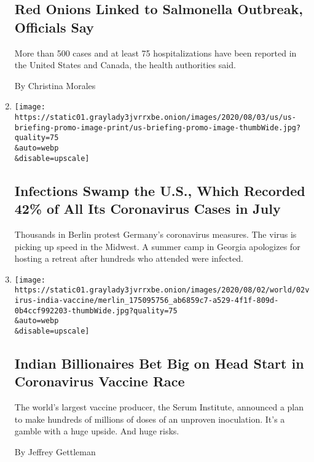 \begin{enumerate}
{  \subsection{Red Onions Linked to Salmonella Outbreak, Officials
  Say}\label{red-onions-linked-to-salmonella-outbreak-officials-say}}

  More than 500 cases and at least 75 hospitalizations have been
  reported in the United States and Canada, the health authorities said.

  By Christina Morales
\item
  \href{/2020/08/01/world/coronavirus-covid-19.html}{}

  \texttt{[image: https://static01.graylady3jvrrxbe.onion/images/2020/08/03/us/us-briefing-promo-image-print/us-briefing-promo-image-thumbWide.jpg?quality=75\\\&auto=webp\\\&disable=upscale]}

  \hypertarget{infections-swamp-the-us-which-recorded-42-of-all-its-coronavirus-cases-in-july}{%
  \subsection{Infections Swamp the U.S., Which Recorded 42\% of All Its
  Coronavirus Cases in
  July}\label{infections-swamp-the-us-which-recorded-42-of-all-its-coronavirus-cases-in-july}}

  Thousands in Berlin protest Germany's coronavirus measures. The virus
  is picking up speed in the Midwest. A summer camp in Georgia
  apologizes for hosting a retreat after hundreds who attended were
  infected.
\item
  \href{/2020/08/01/world/asia/coronavirus-vaccine-india.html}{}

  \texttt{[image: https://static01.graylady3jvrrxbe.onion/images/2020/08/02/world/02virus-india-vaccine/merlin\_175095756\_ab6859c7-a529-4f1f-809d-0b4ccf992203-thumbWide.jpg?quality=75\\\&auto=webp\\\&disable=upscale]}

  \hypertarget{indian-billionaires-bet-big-on-head-start-in-coronavirus-vaccine-race}{%
  \subsection{Indian Billionaires Bet Big on Head Start in Coronavirus
  Vaccine
  Race}\label{indian-billionaires-bet-big-on-head-start-in-coronavirus-vaccine-race}}

  The world's largest vaccine producer, the Serum Institute, announced a
  plan to make hundreds of millions of doses of an unproven inoculation.
  It's a gamble with a huge upside. And huge risks.

  By Jeffrey Gettleman
\end{enumerate}

